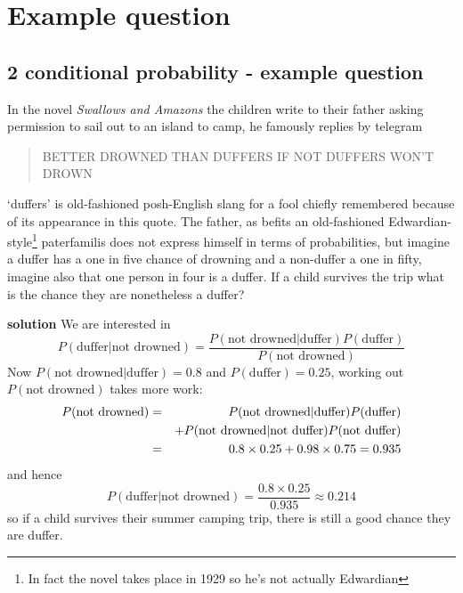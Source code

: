 
\ifind
\section*{Example question}
\else
\subsection*{2 conditional probability - example question}
\fi In the novel \textit{Swallows and Amazons} the children write to
their father asking permission to sail out to an island to camp, he famously replies by telegram
\begin{quote}
  BETTER DROWNED THAN DUFFERS IF NOT DUFFERS WON'T DROWN
\end{quote}
`duffers' is old-fashioned posh-English slang for a fool chiefly
remembered because of its appearance in this quote. The father, as
befits an old-fashioned Edwardian-style\footnote{In fact the novel
  takes place in 1929 so he's not actually Edwardian} paterfamilis does not
express himself in terms of probabilities, but imagine a duffer has a
one in five chance of drowning and a non-duffer a one in fifty,
imagine also that one person in four is a duffer. If a child survives
the trip what is the chance they are nonetheless a duffer?

\noindent \textbf{solution} We are interested in
\begin{equation}
  P(\mbox{duffer}|\mbox{not drowned})=\frac{P(\mbox{not drowned}|\mbox{duffer})P(\mbox{duffer})}{P(\mbox{not drowned})}
\end{equation}
Now $P(\mbox{not drowned}|\mbox{duffer})=0.8$ and $P(\mbox{duffer})=0.25$, working out $P(\mbox{not drowned})$ takes more work:
\begin{eqnarray}
  P(\mbox{not drowned})&=&P(\mbox{not drowned}|\mbox{duffer})P(\mbox{duffer})\cr&& +P(\mbox{not drowned}|\mbox{not duffer})P(\mbox{not duffer})\cr &=&0.8\times 0.25+0.98\times 0.75=0.935
\end{eqnarray}
and hence
\begin{equation}
  P(\mbox{duffer}|\mbox{not drowned})=\frac{0.8\times 0.25}{0.935}\approx 0.214
\end{equation}
so if a child survives their summer camping trip, there is still a
good chance they are duffer.
